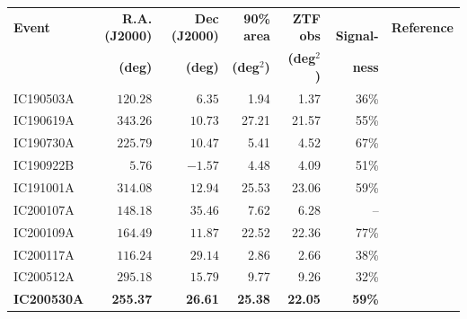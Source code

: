 \documentclass[
    a4paper, %
    fontsize=10pt, %
    twoside=true, %
    numbers=noenddot, %
    fontmethod=tex,
]{kaobook}
\begin{document}
\appendix

\begin{table}
\centering
\small
    \begin{tabular}{l r r r r r c} 
        \textbf{Event} & \textbf{R.A. (J2000)} & \textbf{Dec (J2000)} & \textbf{90\% area} & \textbf{ZTF obs} &~ \textbf{Signal-}& \textbf{Reference}\\
        & \textbf{(deg)}&\textbf{(deg)}& \textbf{(deg$^{2}$)}& \textbf{(deg$^{2}$)} & \textbf{ness} &\\
        \hline
        IC190503A & $120.28$ & $6.35$ & 1.94 & 1.37 & 36\%&\cite{IC190503A1, IC190503A2}\\
        IC190619A & $343.26$ & $10.73$ & 27.21 & 21.57 & 55\%&\cite{IC190619A1, IC190619A2}\\
        IC190730A & $225.79$ & $10.47$ & 5.41 & 4.52 & 67\%&\cite{IC190730A1, IC190730A2}\\
        IC190922B & $5.76$ & $-1.57$ & 4.48 & 4.09 & 51\%&\cite{IC190922B1, IC190922B2, IC190922B3}\\
        IC191001A & $314.08$ & $12.94$ & 25.53 & 23.06 & 59\%& \cite{IC191001A1, IC191001A2, IC191001A3}\\
        IC200107A & $148.18$ & $35.46$ & 7.62 & 6.28 & -- &\cite{IC200107A1, IC200107A2}\\
        IC200109A & $164.49$ & $11.87$ & 22.52 & 22.36 & 77\%&\cite{IC200109A1, IC200109A2}\\
        IC200117A & $116.24$ & $29.14$ & 2.86 &  2.66 & 38\%&\cite{IC200117A1, IC200117A2, IC200117A3}\\
        IC200512A & $295.18$ & $15.79$ & 9.77 &  9.26 & 32\%&\cite{IC200512A1, IC200512A2}\\
        \textbf{IC200530A} & \textbf{255.37} & \textbf{26.61} & \textbf{25.38} &  \textbf{22.05} & \textbf{59\%}&\cite{IC200530A1, IC200530A2, IC200530A3, IC200530A4}\\

\end{tabular}
\end{table}
\end{document}
